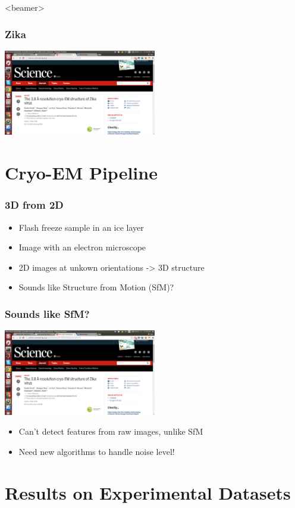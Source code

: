\documentclass{beamer}
\begin{document}
\begin{frame}<beamer>
\frametitle{Zika}
\includegraphics[width=0.5\textwidth]{zika.png}%
\end{frame}

\section{Cryo-EM Pipeline}
\begin{frame}
\frametitle{3D from 2D}
\begin{itemize}
 \item Flash freeze sample in an ice layer
 \item Image with an electron microscope
 \item 2D images at unkown orientations -> 3D structure
 \item Sounds like Structure from Motion (SfM)?
\end{itemize}
\end{frame}

\begin{frame}
\frametitle{Sounds like SfM?}
\includegraphics[width=0.5\textwidth]{zika.png}%
\begin{itemize}
  \item Can't detect features from raw images, unlike SfM
 \item Need new algorithms to handle noise level!
\end{itemize}
\end{frame}

\section{Results on Experimental Datasets}
\end{document}
